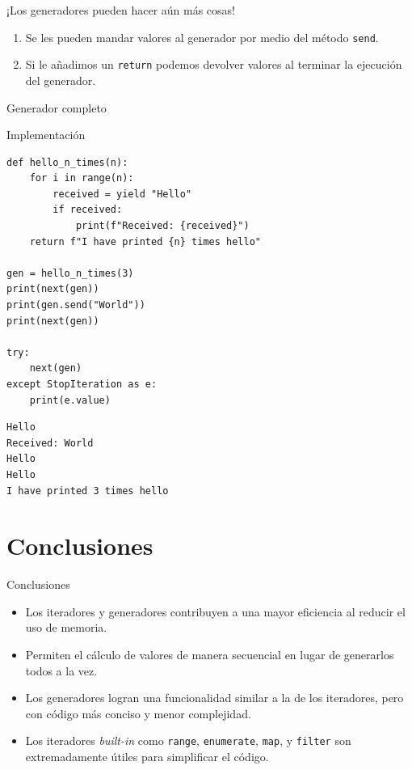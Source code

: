\documentclass[12pt]{beamer}
\begin{document}
\begin{frame}{¡Los generadores pueden hacer aún más cosas!}
    \begin{enumerate}
        \item Se les pueden mandar valores al generador por medio del método \texttt{send}.
        \item Si le añadimos un \texttt{return} podemos devolver valores al terminar la ejecución del generador.
    \end{enumerate}
\end{frame}

\begin{frame}[fragile]{Generador completo}
\begin{block}{Implementación}
\begin{verbatim}
def hello_n_times(n):
    for i in range(n):
        received = yield "Hello"
        if received: 
            print(f"Received: {received}")
    return f"I have printed {n} times hello"

gen = hello_n_times(3)
print(next(gen))
print(gen.send("World")) 
print(next(gen))  

try:
    next(gen)
except StopIteration as e:
    print(e.value)
\end{verbatim}
\begin{verbatim}
Hello
Received: World
Hello
Hello
I have printed 3 times hello 
\end{verbatim}
\end{block}
\end{frame}

\section{Conclusiones}

\begin{frame}{Conclusiones}
    \begin{itemize}
        \item Los iteradores y generadores contribuyen a una mayor eficiencia al reducir el uso de memoria.
        \item Permiten el cálculo de valores de manera secuencial en lugar de generarlos todos a la vez.
        \item Los generadores logran una funcionalidad similar a la de los iteradores, pero con código más conciso y menor complejidad.
        \item Los iteradores \textit{built-in} como \texttt{range}, \texttt{enumerate}, \texttt{map}, y \texttt{filter} son extremadamente útiles para simplificar el código.
    \end{itemize}
\end{frame}
\end{document}
